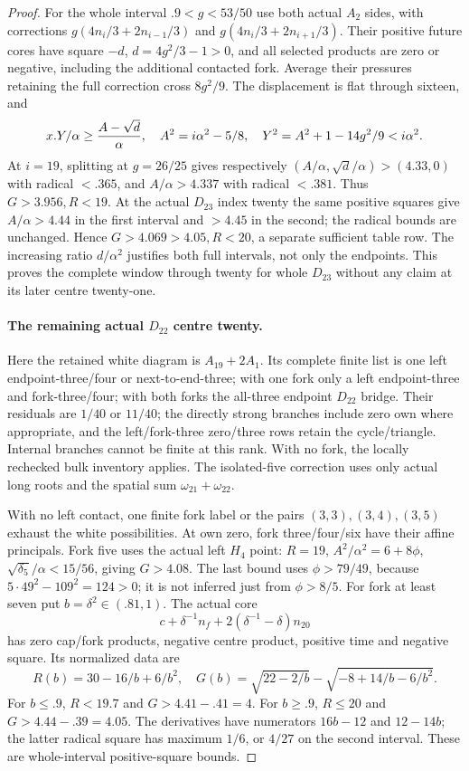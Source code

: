 \documentclass[11pt]{article}
\theoremstyle{definition}
\theoremstyle{remark}
\begin{document}
\begin{proof}
For the whole interval $.9<g<53/50$ use both actual $A_2$ sides,
with corrections $g(4n_i/3+2n_{i-1}/3)$ and
$g(4n_i/3+2n_{i+1}/3)$. Their positive future cores have square
$-d$, $d=4g^2/3-1>0$, and all selected products are zero or
negative, including the additional contacted fork. Average their
pressures retaining the full correction cross $8g^2/9$.
The displacement is flat through sixteen, and
\[
 x.Y/\alpha\ge{A-\sqrt d\over\alpha},\quad
 A^2=i\alpha^2-5/8,\quad
 Y^2=A^2+1-14g^2/9<i\alpha^2.
\]
At $i=19$, splitting at $g=26/25$ gives respectively
$(A/\alpha,\sqrt d/\alpha)>(4.33,0)$ with radical $<.365$,
and $A/\alpha>4.337$ with radical $<.381$. Thus $G>3.956,R<19$.
At the actual $D_{23}$ index twenty the same positive squares give
$A/\alpha>4.44$ in the first interval and $>4.45$ in the second;
the radical bounds are unchanged. Hence $G>4.069>4.05,R<20$,
a separate sufficient table row. The increasing ratio $d/\alpha^2$
justifies both full intervals, not only the endpoints. This proves
the complete window through twenty for whole $D_{23}$ without any
claim at its later centre twenty-one.

\paragraph{The remaining actual $D_{22}$ centre twenty.}
Here the retained white diagram is $A_{19}+2A_1$. Its complete
finite list is one left endpoint-three/four or next-to-end-three;
with one fork only a left endpoint-three and fork-three/four;
with both forks the all-three endpoint $D_{22}$ bridge.
Their residuals are $1/40$ or $11/40$; the directly strong
branches include zero own where appropriate, and the left/fork-three
zero/three rows retain the cycle/triangle. Internal branches cannot
be finite at this rank. With no fork, the locally rechecked bulk
inventory applies. The isolated-five correction uses only actual
long roots and the spatial sum $\omega_{21}+\omega_{22}$.

With no left contact, one finite fork label or the pairs
$(3,3),(3,4),(3,5)$ exhaust the white possibilities. At own zero,
fork three/four/six have their affine principals. Fork five uses
the actual left $H_4$ point: $R=19$, $A^2/\alpha^2=6+8\phi$,
$\sqrt{\delta_5}/\alpha<15/56$, giving $G>4.08$.
The last bound uses $\phi>79/49$, because
$5\cdot49^2-109^2=124>0$; it is not inferred just from $\phi>8/5$.
For fork at least seven put $b=\delta^2\in(.81,1)$. The actual core
\[
 c+\delta^{-1}n_f+2(\delta^{-1}-\delta)n_{20}
\]
has zero cap/fork products, negative centre product, positive time
and negative square. Its normalized data are
\[
 R(b)=30-16/b+6/b^2,\quad
 G(b)=\sqrt{22-2/b}-\sqrt{-8+14/b-6/b^2}.
\]
For $b\le.9$, $R<19.7$ and $G>4.41-.41=4$.
For $b\ge.9$, $R\le20$ and $G>4.44-.39=4.05$.
The derivatives have numerators $16b-12$ and $12-14b$;
the latter radical square has maximum $1/6$, or $4/27$ on the
second interval. These are whole-interval positive-square bounds.


\end{proof}
\end{document}
